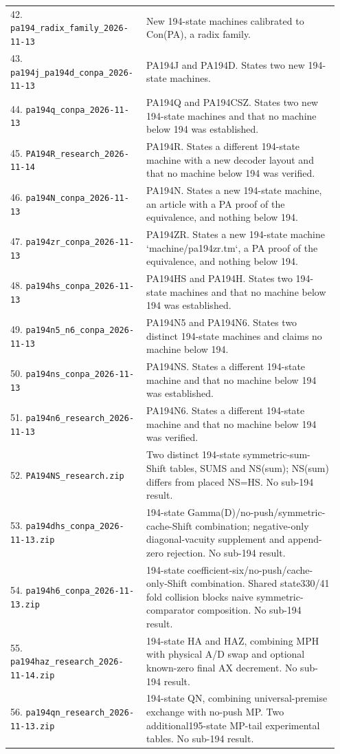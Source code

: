 \begin{longtable}{@{}p{0.37\linewidth}p{0.58\linewidth}@{}}
42. \nolinkurl{pa194_radix_family_2026-11-13} & New 194-state machines calibrated to Con(PA), a radix family.\\[5pt]
43. \nolinkurl{pa194j_pa194d_conpa_2026-11-13} & PA194J and PA194D. States two new 194-state machines.\\[5pt]
44. \nolinkurl{pa194q_conpa_2026-11-13} & PA194Q and PA194CSZ. States two new 194-state machines and that no machine below 194 was established.\\[5pt]
45. \nolinkurl{PA194R_research_2026-11-14} & PA194R. States a different 194-state machine with a new decoder layout and that no machine below 194 was verified.\\[5pt]
46. \nolinkurl{pa194N_conpa_2026-11-13} & PA194N. States a new 194-state machine, an article with a PA proof of the equivalence, and nothing below 194.\\[5pt]
47. \nolinkurl{pa194zr_conpa_2026-11-13} & PA194ZR. States a new 194-state machine `machine/pa194zr.tm`, a PA proof of the equivalence, and nothing below 194.\\[5pt]
48. \nolinkurl{pa194hs_conpa_2026-11-13} & PA194HS and PA194H. States two 194-state machines and that no machine below 194 was established.\\[5pt]
49. \nolinkurl{pa194n5_n6_conpa_2026-11-13} & PA194N5 and PA194N6. States two distinct 194-state machines and claims no machine below 194.\\[5pt]
50. \nolinkurl{pa194ns_conpa_2026-11-13} & PA194NS. States a different 194-state machine and that no machine below 194 was established.\\[5pt]
51. \nolinkurl{pa194n6_research_2026-11-13} & PA194N6. States a different 194-state machine and that no machine below 194 was verified.\\[5pt]
52. \nolinkurl{PA194NS_research.zip} & Two distinct 194-state symmetric-sum-Shift tables, SUMS and NS(sum); NS(sum) differs from placed NS=HS. No sub-194 result.\\[5pt]
53. \nolinkurl{pa194dhs_conpa_2026-11-13.zip} & 194-state Gamma(D)/no-push/symmetric-cache-Shift combination; negative-only diagonal-vacuity supplement and append-zero rejection. No sub-194 result.\\[5pt]
54. \nolinkurl{pa194h6_conpa_2026-11-13.zip} & 194-state coefficient-six/no-push/cache-only-Shift combination. Shared state330/41 fold collision blocks naive symmetric-comparator composition. No sub-194 result.\\[5pt]
55. \nolinkurl{pa194haz_research_2026-11-14.zip} & 194-state HA and HAZ, combining MPH with physical A/D swap and optional known-zero final AX decrement. No sub-194 result.\\[5pt]
56. \nolinkurl{pa194qn_research_2026-11-13.zip} & 194-state QN, combining universal-premise exchange with no-push MP. Two additional195-state MP-tail experimental tables. No sub-194 result.\\[5pt]
\bottomrule
\end{longtable}
\normalsize
